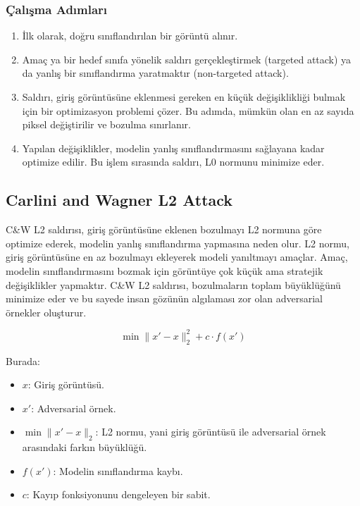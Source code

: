 \subsubsection{Çalışma Adımları}

\begin{enumerate}
    \item İlk olarak, doğru sınıflandırılan bir görüntü alınır.
    \item Amaç ya bir hedef sınıfa yönelik saldırı gerçekleştirmek (targeted attack) ya da yanlış bir sınıflandırma yaratmaktır (non-targeted attack).
    \item Saldırı, giriş görüntüsüne eklenmesi gereken en küçük değişiklikliği bulmak için bir optimizasyon problemi çözer. Bu adımda, mümkün olan en az sayıda piksel değiştirilir ve bozulma sınırlanır.
    \item Yapılan değişiklikler, modelin yanlış sınıflandırmasını sağlayana kadar optimize edilir. Bu işlem sırasında saldırı, L0 normunu minimize eder.
\end{enumerate}

\newpage

\subsection{Carlini and Wagner L2 Attack}

C\&W L2 saldırısı, giriş görüntüsüne eklenen bozulmayı L2 normuna göre optimize ederek, modelin yanlış sınıflandırma yapmasına neden olur. L2 normu, giriş görüntüsüne en az bozulmayı ekleyerek modeli yanıltmayı amaçlar. Amaç, modelin sınıflandırmasını bozmak için görüntüye çok küçük ama stratejik değişiklikler yapmaktır. C\&W L2 saldırısı, bozulmaların toplam büyüklüğünü minimize eder ve bu sayede insan gözünün algılaması zor olan adversarial örnekler oluşturur.

\[ \min \|x' - x\|_2^2 + c \cdot f(x') \]

Burada:

\begin{itemize}
    \item $x$: Giriş görüntüsü.
    \item $x'$: Adversarial örnek.
    \item $\min \|x' - x\|_2$: L2 normu, yani giriş görüntüsü ile adversarial örnek arasındaki farkın büyüklüğü.
    \item $f(x')$: Modelin sınıflandırma kaybı.
    \item $c$: Kayıp fonksiyonunu dengeleyen bir sabit.
\end{itemize}

